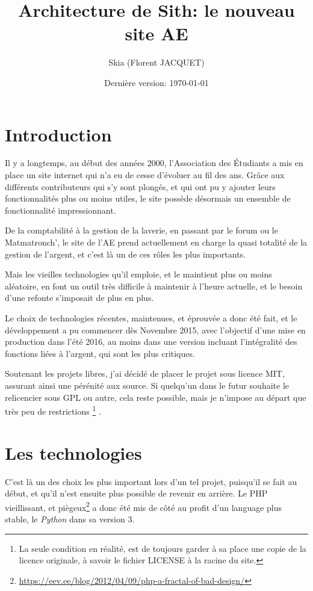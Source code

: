 \documentclass[a4paper]{report}
\title{Architecture de Sith: le nouveau site AE}
\author{Skia (Florent JACQUET)}
\date{Dernière version: \today}
\begin{document}
\maketitle

\tableofcontents

\chapter{Introduction}
\par Il y a longtemps, au début des années 2000, l'Association des Étudiants a mis en place un site internet qui n'a eu de
cesse d'évoluer au fil des ans. Grâce aux différents contributeurs qui s'y sont plongés, et qui ont pu y ajouter leurs
fonctionnalités plus ou moins utiles, le site possède désormais un ensemble de fonctionnalité impressionnant.
\par De la comptabilité à la gestion de la laverie, en passant par le forum ou le Matmatronch', le site de l'AE prend
actuellement en charge la quasi totalité de la gestion de l'argent, et c'est là un de ces rôles les plus importants.
\par Mais les vieilles technologies qu'il emploie, et le maintient plus ou moins aléatoire, en font un outil très difficile à
maintenir à l'heure actuelle, et le besoin d'une refonte s'imposait de plus en plus.
\par Le choix de technologies récentes, maintenues, et éprouvée a donc été fait, et le développement a pu commencer dès
Novembre 2015, avec l'objectif d'une mise en production dans l'été 2016, au moins dans une version incluant
l'intégralité des fonctions liées à l'argent, qui sont les plus critiques.
\par Soutenant les projets libres, j'ai décidé de placer le projet sous licence MIT, assurant ainsi une pérénité aux
source. Si quelqu'un dans le futur souhaite le relicencier sous GPL ou autre, cela reste possible, mais je n'impose au
départ que très peu de restrictions \footnote{La seule condition en réalité, est de toujours garder à sa place une copie
de la licence originale, à savoir le fichier LICENSE à la racine du site.} .

\chapter{Les technologies}
\label{cha:les_technologies}
\par C'est là un des choix les plus important lors d'un tel projet, puisqu'il se fait au début, et qu'il n'est ensuite plus
possible de revenir en arrière. Le PHP vieillissant, et
piègeux\footnote{\url{https://eev.ee/blog/2012/04/09/php-a-fractal-of-bad-design/}} a donc été mis de côté au profit
d'un language plus stable, le \emph{Python} dans sa version 3.
\end{document}
